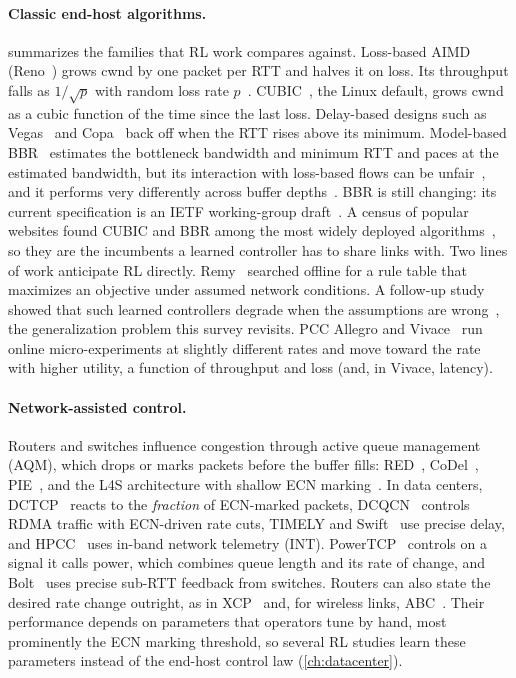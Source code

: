 \paragraph{Classic end-host algorithms.}  summarizes the families that RL work compares against. Loss-based AIMD (Reno~\cite{rfc5681}) grows cwnd by one packet per RTT and halves it on loss. Its throughput falls as $1/\sqrt{p}$ with random loss rate $p$~\cite{mathis1997macroscopic}. CUBIC~\cite{ha2008cubic,rfc9438}, the Linux default, grows cwnd as a cubic function of the time since the last loss. Delay-based designs such as Vegas~\cite{brakmo1995vegas} and Copa~\cite{arun2018copa} back off when the RTT rises above its minimum. Model-based BBR~\cite{cardwell2016bbr} estimates the bottleneck bandwidth and minimum RTT and paces at the estimated bandwidth, but its interaction with loss-based flows can be unfair~\cite{ware2019bbr}, and it performs very differently across buffer depths~\cite{cao2019use}. BBR is still changing: its current specification is an IETF working-group draft~\cite{cardwell2026bbr}. A census of popular websites found CUBIC and BBR among the most widely deployed algorithms~\cite{mishra2019census}, so they are the incumbents a learned controller has to share links with. Two lines of work anticipate RL directly. Remy~\cite{winstein2013remy} searched offline for a rule table that maximizes an objective under assumed network conditions. A follow-up study showed that such learned controllers degrade when the assumptions are wrong~\cite{sivaraman2014learnability}, the generalization problem this survey revisits. PCC Allegro and Vivace~\cite{dong2015pcc,dong2018vivace} run online micro-experiments at slightly different rates and move toward the rate with higher utility, a function of throughput and loss (and, in Vivace, latency).

\paragraph{Network-assisted control.} Routers and switches influence congestion through active queue management (AQM), which drops or marks packets before the buffer fills: RED~\cite{floyd1993red}, CoDel~\cite{nichols2012codel}, PIE~\cite{rfc8033}, and the L4S architecture with shallow ECN marking~\cite{rfc9330}. In data centers, DCTCP~\cite{alizadeh2010dctcp} reacts to the \emph{fraction} of ECN-marked packets, DCQCN~\cite{zhu2015dcqcn} controls RDMA traffic with ECN-driven rate cuts, TIMELY and Swift~\cite{mittal2015timely,kumar2020swift} use precise delay, and HPCC~\cite{li2019hpcc} uses in-band network telemetry (INT). PowerTCP~\cite{addanki2022powertcp} controls on a signal it calls power, which combines queue length and its rate of change, and Bolt~\cite{arslan2023bolt} uses precise sub-RTT feedback from switches. Routers can also state the desired rate change outright, as in XCP~\cite{katabi2002congestion} and, for wireless links, ABC~\cite{goyal2020abc}. Their performance depends on parameters that operators tune by hand, most prominently the ECN marking threshold, so several RL studies learn these parameters instead of the end-host control law (\cref{ch:datacenter}).

